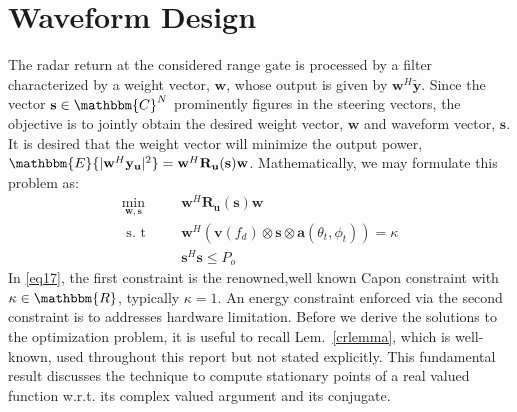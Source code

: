 \documentclass[11pt,draftclsnofoot,onecolumn]{IEEEtran}
\theoremstyle{definition}
\theoremstyle{remark}
\begin{document}
\section{Waveform Design}
The radar return at the considered range gate is processed by a filter characterized by a weight vector, $\mathbf{w}$, whose output is given by $\mathbf{w}^H\mathbf{\tilde{y}}$. Since the vector $\mathbf{s} \in\mathbbm{C}^{N}$ prominently figures in the steering vectors, the objective is to jointly obtain the desired weight vector, $\mathbf{w}$ and waveform vector, $\mathbf{s}$. It is desired that the weight vector will  minimize the output power, $\mathbbm{E}\{|\mathbf{w}^H\mathbf{y_u}|^2\}=\mathbf{w}^H\mathbf{R_u}( \mathbf{s})\mathbf{w}$. Mathematically, we may formulate this problem as:
\begin{align}
\min_{\mathbf{w},\mathbf{s}}\;\;\;\;\; &\mathbf{w}^H\mathbf{R_u}( \mathbf{s})\mathbf{w}\label{eq17} \\
\mbox{ s. t } \;\;\;\;\;&\mathbf{w}^H(\mathbf{v}(f_d)\otimes\mathbf{s}\otimes\mathbf{a}(\theta_t,\phi_t))=\kappa \nonumber \\
\;\;\;\;\;\; & \mathbf{s}^H \mathbf{s}\leq P_o \nonumber \nonumber
\end{align}
In \eqref{eq17}, the first constraint is the renowned,well known Capon constraint with $\kappa\in\mathbbm{R}$, typically $\kappa=1$. An energy constraint enforced via the second constraint is to addresses hardware limitation.  Before we derive the solutions to the optimization problem, it is useful to recall  Lem.~\ref{crlemma}, which is well-known, used throughout this report but not stated explicitly. This fundamental result discusses the technique to compute stationary points of a real valued function w.r.t. its complex valued argument and its conjugate.
\end{document}

